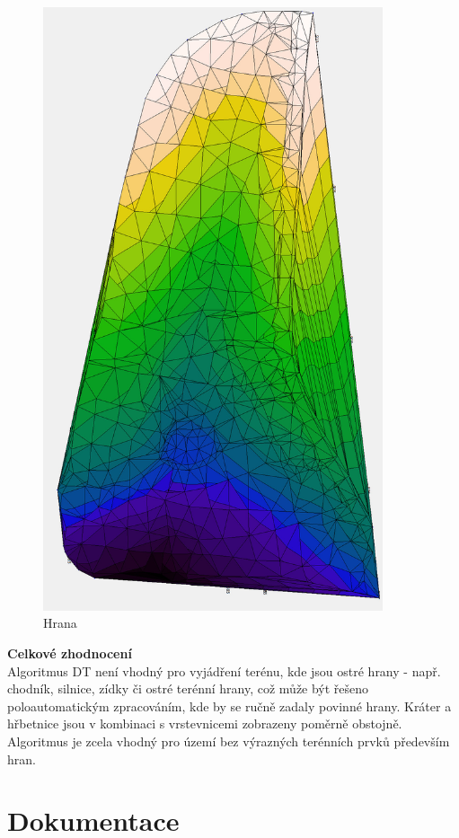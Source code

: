 \documentclass[a4paper, 12pt]{article}
\begin{document}
\begin{figure}[h]
	\centering
	\includegraphics[width=10cm]{DMT_hypsometrie.jpg}
	\caption{Hrana}
\end{figure}
\clearpage

\textbf{Celkové zhodnocení}\\

Algoritmus DT není vhodný pro vyjádření terénu, kde jsou ostré hrany - např. chodník, silnice, zídky či ostré terénní hrany, což může být řešeno poloautomatickým zpracováním, kde by se ručně zadaly povinné hrany. Kráter a hřbetnice jsou v kombinaci s vrstevnicemi zobrazeny poměrně obstojně. Algoritmus je zcela vhodný pro území bez výrazných terénních prvků především hran.
\clearpage

\section {Dokumentace}
\end{document}
